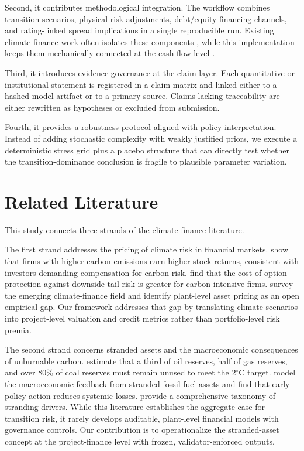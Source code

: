 \documentclass[preprint,12pt]{elsarticle}
\begin{document}
Second, it contributes methodological integration. The workflow combines transition scenarios, physical risk adjustments, debt/equity financing channels, and rating-linked spread implications in a single reproducible run. Existing climate-finance work often isolates these components \citep{bolton2021investors,ilhan2021carbon}, while this implementation keeps them mechanically connected at the cash-flow level \citep{caldecott2021stranded,vanvliet2016power}.

Third, it introduces evidence governance at the claim layer. Each quantitative or institutional statement is registered in a claim matrix and linked either to a hashed model artifact or to a primary source. Claims lacking traceability are either rewritten as hypotheses or excluded from submission.

Fourth, it provides a robustness protocol aligned with policy interpretation. Instead of adding stochastic complexity with weakly justified priors, we execute a deterministic stress grid plus a placebo structure that can directly test whether the transition-dominance conclusion is fragile to plausible parameter variation.

\section{Related Literature}
This study connects three strands of the climate-finance literature.

The first strand addresses the pricing of climate risk in financial markets. \citet{bolton2021investors} show that firms with higher carbon emissions earn higher stock returns, consistent with investors demanding compensation for carbon risk. \citet{ilhan2021carbon} find that the cost of option protection against downside tail risk is greater for carbon-intensive firms. \citet{giglio2021climate} survey the emerging climate-finance field and identify plant-level asset pricing as an open empirical gap. Our framework addresses that gap by translating climate scenarios into project-level valuation and credit metrics rather than portfolio-level risk premia.

The second strand concerns stranded assets and the macroeconomic consequences of unburnable carbon. \citet{mcglade2015geographical} estimate that a third of oil reserves, half of gas reserves, and over 80\% of coal reserves must remain unused to meet the 2$^\circ$C target. \citet{mercure2018stranded} model the macroeconomic feedback from stranded fossil fuel assets and find that early policy action reduces systemic losses. \citet{caldecott2021stranded} provide a comprehensive taxonomy of stranding drivers. While this literature establishes the aggregate case for transition risk, it rarely develops auditable, plant-level financial models with governance controls. Our contribution is to operationalize the stranded-asset concept at the project-finance level with frozen, validator-enforced outputs.
\end{document}
